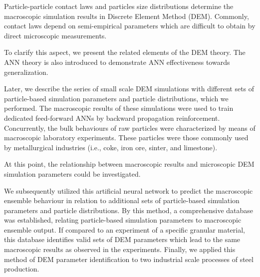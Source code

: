 Particle-particle contact laws and particles size distributions determine the
macroscopic simulation results in Discrete Element Method (DEM). 
Commonly, contact laws depend on semi-empirical parameters which 
are difficult to obtain by direct microscopic measurements. 

To clarify this aspect, we present the related elements of the DEM
theory.
The ANN theory is also introduced to demonstrate ANN effectiveness towards
generalization.

Later, we describe the series of small scale DEM simulations with different sets
of particle-based simulation parameters and particle distributions, which we
performed.
The macroscopic results of these simulations were used to train dedicated
feed-forward ANNs by backward propagation reinforcement.
Concurrently, the bulk behaviours of raw particles were characterized by means
of macroscopic laboratory experiments. These particles were those commonly used
by metallurgical industries (i.e., coke, iron ore, sinter, and limestone).

At this point, the relationship between macroscopic results and microscopic DEM
simulation parameters could be investigated.

We subsequently utilized this artificial neural network to predict the
macroscopic ensemble behaviour in relation to additional sets of particle-based simulation parameters and particle distributions. 
By this method, a comprehensive database was established, relating particle-based 
simulation parameters to macroscopic ensemble output.
If compared to an experiment of a specific granular material, this database identifies 
valid sets of DEM parameters which lead to the same macroscopic results as observed in the experiments.
Finally, we applied this method of DEM parameter identification to two industrial
scale processes of steel production.




\endgroup			

\vfill

%
